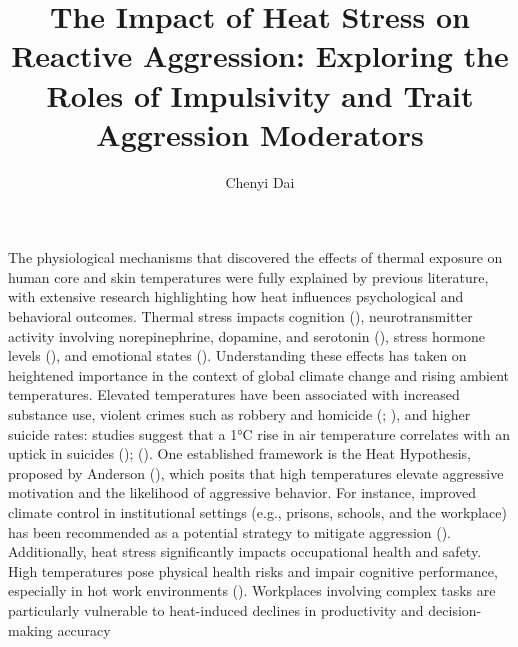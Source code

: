 \documentclass[
  man,
  floatsintext,
  longtable,
  nolmodern,
  notxfonts,
  notimes,
  colorlinks=true,linkcolor=blue,citecolor=blue,urlcolor=blue]{apa7}
\title{The Impact of Heat Stress on Reactive Aggression: Exploring the
Roles of Impulsivity and Trait Aggression Moderators}
\author{Chenyi Dai}
\affiliation{
{Department of Psychology, University of Chicago}}
\begin{document}
\maketitle


\setcounter{secnumdepth}{-\maxdimen} %

\setlength\LTleft{0pt}


The physiological mechanisms that discovered the effects of thermal
exposure on human core and skin temperatures were fully explained by
previous literature, with extensive research highlighting how heat
influences psychological and behavioral outcomes. Thermal stress impacts
cognition (), neurotransmitter activity involving norepinephrine,
dopamine, and serotonin
(),
stress hormone levels
(), and emotional states
().
Understanding these effects has taken on heightened importance in the
context of global climate change and rising ambient temperatures.
Elevated temperatures have been associated with increased substance use,
violent crimes such as robbery and homicide
(;
), and higher suicide rates: studies suggest that a 1°C rise in air
temperature correlates with an uptick in suicides
(); (). One established framework is the Heat Hypothesis, proposed
by Anderson (), which
posits that high temperatures elevate aggressive motivation and the
likelihood of aggressive behavior. For instance, improved climate
control in institutional settings (e.g., prisons, schools, and the
workplace) has been recommended as a potential strategy to mitigate
aggression ().
Additionally, heat stress significantly impacts occupational health and
safety. High temperatures pose physical health risks and impair
cognitive performance, especially in hot work environments
(). Workplaces involving complex tasks are particularly vulnerable
to heat-induced declines in productivity and decision-making accuracy
\end{document}
